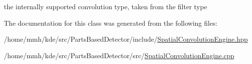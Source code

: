 the internally supported convolution type, taken from the filter type 



The documentation for this class was generated from the following files\-:\begin{DoxyCompactItemize}
\item 
/home/mmh/kde/src/\-Parts\-Based\-Detector/include/\hyperlink{SpatialConvolutionEngine_8hpp}{Spatial\-Convolution\-Engine.\-hpp}\item 
/home/mmh/kde/src/\-Parts\-Based\-Detector/src/\hyperlink{SpatialConvolutionEngine_8cpp}{Spatial\-Convolution\-Engine.\-cpp}\end{DoxyCompactItemize}
